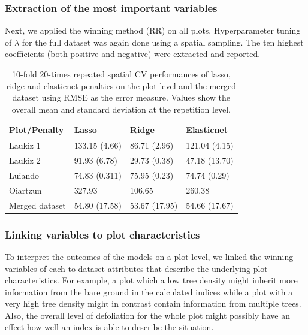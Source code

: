\documentclass[review]{elsarticle}
\begin{document}
\subsubsection{Extraction of the most important variables}

Next, we applied the winning method (\ac{RR}) on all plots.
Hyperparameter tuning of $\lambda$ for the full dataset was again done using a spatial sampling.
The ten highest coefficients (both positive and negative) were extracted and reported.

\begin{table}[b!]
\centering
\caption[t]{10-fold 20-times repeated spatial \ac{CV} performances of lasso, ridge and elasticnet penalties on the plot level and the merged dataset using \ac{RMSE} as the error measure. Values show the overall mean and standard deviation at the repetition level.}
\begingroup\footnotesize
\begin{tabular}{llll}
	\\
	Plot/Penalty   & Lasso         & Ridge         & Elasticnet    \\
	\hline
	Laukiz 1       & 133.15 (4.66) & 86.71 (2.96)  & 121.04 (4.15) \\
	Laukiz 2       & 91.93 (6.78)  & 29.73 (0.38)  & 47.18 (13.70) \\
	Luiando        & 74.83 (0.311) & 75.95 (0.23)  & 74.74 (0.29)  \\
	Oiartzun       & 327.93        & 106.65        & 260.38        \\
	Merged dataset & 54.80 (17.58) & 53.67 (17.95) & 54.66 (17.67) \\
	\bottomrule
\end{tabular}
\endgroup
\label{tab:penalty_comparison}
\end{table}

\subsubsection{Linking variables to plot characteristics}

To interpret the outcomes of the models on a plot level, we linked the winning variables of each to dataset attributes that describe the underlying plot characteristics.
For example, a plot which a low tree density might inherit more information from the bare ground in the calculated indices while a plot with a very high tree density might in contrast contain information from multiple trees.
Also, the overall level of defoliation for the whole plot might possibly have an effect how well an index is able to describe the situation.
\end{document}
